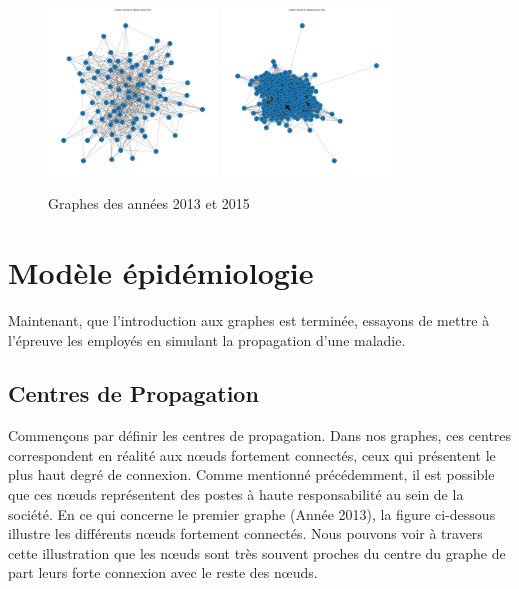 \documentclass{article}
\begin{document}
\begin{figure}[!h]
    \centering
    \includegraphics[width=0.40\textwidth]{assets/proprietebase/2013}
    \hfill
    \includegraphics[width=0.40\textwidth]{assets/proprietebase/2015}
    \caption{Graphes des années 2013 et 2015}
    \label{fig:2013-2015}
\end{figure}

\section{Modèle épidémiologie}

Maintenant, que l'introduction aux graphes est terminée, essayons de mettre à l'épreuve les employés en simulant la propagation d'une maladie.

\subsection{Centres de Propagation}

Commençons par définir les centres de propagation. Dans nos graphes, ces centres correspondent en réalité aux nœuds fortement connectés, ceux qui présentent le plus haut degré de connexion. Comme mentionné précédemment, il est possible que ces nœuds représentent des postes à haute responsabilité au sein de la société. En ce qui concerne le premier graphe (Année 2013), la figure ci-dessous illustre les différents nœuds fortement connectés. Nous pouvons voir à travers cette illustration que les nœuds sont très souvent proches du centre du graphe de part leurs forte connexion avec le reste des nœuds.
\end{document}
